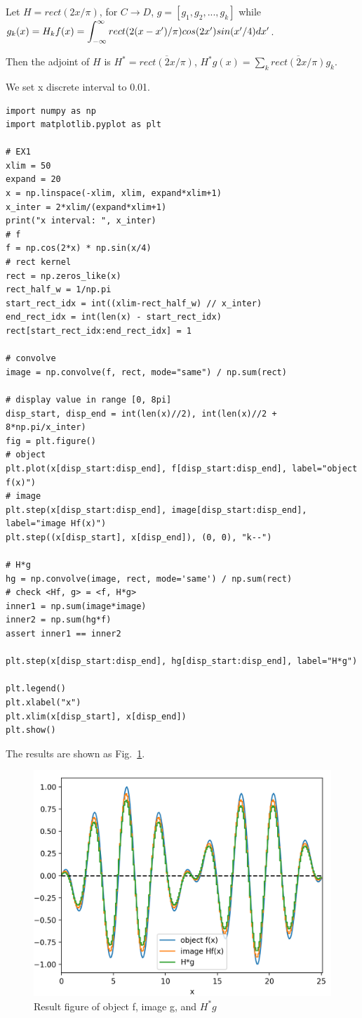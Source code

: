 \documentclass[11pt,a4paper]{article}
\begin{document}
Let $H=rect(2x/\pi)$, for $C\rightarrow D$, $g=[g_1, g_2, ..., g_k]$ while $g_k(x)=H_kf(x)=\bint{-\infty}{\infty} rect(2(x-x')/\pi) cos(2x')sin(x'/4)dx'$. 

Then the adjoint of $H$ is $H^*=\overline{rect(2x/\pi)}$, $H^*g(x)=\sum_k \overline{rect(2x/\pi)}g_k$. 

We set x discrete interval to 0.01.

\begin{lstlisting}
import numpy as np
import matplotlib.pyplot as plt

# EX1 
xlim = 50
expand = 20
x = np.linspace(-xlim, xlim, expand*xlim+1)
x_inter = 2*xlim/(expand*xlim+1)
print("x interval: ", x_inter)
# f
f = np.cos(2*x) * np.sin(x/4)
# rect kernel
rect = np.zeros_like(x)
rect_half_w = 1/np.pi
start_rect_idx = int((xlim-rect_half_w) // x_inter)
end_rect_idx = int(len(x) - start_rect_idx)
rect[start_rect_idx:end_rect_idx] = 1

# convolve 
image = np.convolve(f, rect, mode="same") / np.sum(rect)

# display value in range [0, 8pi]
disp_start, disp_end = int(len(x)//2), int(len(x)//2 + 8*np.pi/x_inter)
fig = plt.figure()
# object 
plt.plot(x[disp_start:disp_end], f[disp_start:disp_end], label="object f(x)")
# image
plt.step(x[disp_start:disp_end], image[disp_start:disp_end], label="image Hf(x)")
plt.step((x[disp_start], x[disp_end]), (0, 0), "k--")

# H*g
hg = np.convolve(image, rect, mode='same') / np.sum(rect)
# check <Hf, g> = <f, H*g>
inner1 = np.sum(image*image)
inner2 = np.sum(hg*f)
assert inner1 == inner2

plt.step(x[disp_start:disp_end], hg[disp_start:disp_end], label="H*g")

plt.legend()
plt.xlabel("x")
plt.xlim(x[disp_start], x[disp_end])
plt.show()
\end{lstlisting}

The results are shown as Fig.~\ref{fig:ex1}.

\begin{figure}
    \centering
    \includegraphics[width=\linewidth]{HW2_Q1_1.png}
    \caption{Result figure of object f, image g, and $H^*g$}
    \label{fig:ex1}
\end{figure}
\end{document}
